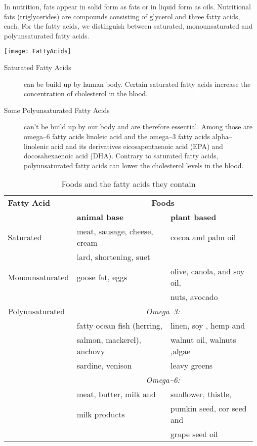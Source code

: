 \documentclass[../main.tex]{subfiles}
\begin{document}
In nutrition, fats appear in solid form as fats or in liquid form as oils.
Nutritional fats (triglycerides) are compounds consisting of glycerol and three fatty acids, each.
For the fatty acids, we distinguish  between saturated,
monounsaturated and polyunsaturated fatty acids.

\vspace{3mm}
{\centering
  \texttt{[image: FattyAcids]}
}

\begin{description}
\item[Saturated Fatty Acids] can be build up by human body.
  Certain saturated fatty acids increase the concentration of cholesterol in the blood.
\item[Some Polyunsaturated Fatty Acids] can't be build up by our body and are therefore essential.
  Among those are omega--6 fatty acids linoleic acid and the
  omega--3 fatty acids alpha--linolenic acid and its derivatives
  eicosapentaenoic acid (EPA) and docosahexaenoic acid (DHA).
  Contrary to saturated fatty acids, polyunsaturated fatty acids can lower the cholesterol levels in the blood.
\end{description}

\begin{table}[htb!]
  \centering
  \begin{tabular}{l|ll}
    \textbf{Fatty Acid} & \multicolumn{2}{c}{\textbf{Foods}} \\
                        & \textbf{animal base} & \textbf{plant based} \\
    \hline
    Saturated & meat, sausage, cheese, cream & cocoa and palm oil \\
                        & lard, shortening, suet \\
    Monounsaturated & goose fat, eggs & olive, canola, and soy oil, \\
                        & & nuts, avocado \\
    Polyunsaturated & \multicolumn{2}{c}{\textit{Omega--3:}} \\
                        & fatty ocean fish (herring,  & linen, soy , hemp and \\
                        & salmon, mackerel), anchovy & walnut oil, walnuts ,algae\\
                        & sardine, venison & leavy greens \\
  & \multicolumn{2}{c}{\textit{Omega--6:}} \\  
                        & meat, butter, milk and & sunflower, thistle, \\
                        & milk products & pumkin seed, cor seed and \\
                        & & grape seed oil \\

  \end{tabular}
  \caption{Foods and the fatty acids they contain}
\end{table}
\end{document}
